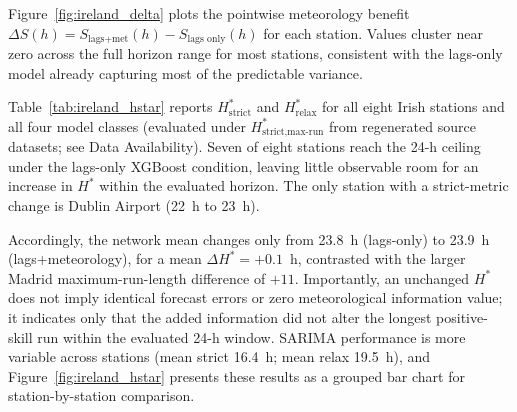 \documentclass[12pt,a4paper]{article}
\begin{document}
Figure~\ref{fig:ireland_delta} plots the pointwise meteorology benefit
$\Delta S(h) = S_{\text{lags+met}}(h) - S_{\text{lags only}}(h)$ for each
station.  Values cluster near zero across the full horizon range for most
stations, consistent with the lags-only model already capturing most of the
predictable variance.

Table~\ref{tab:ireland_hstar} reports $H^*_{\text{strict}}$ and
$H^*_{\text{relax}}$ for all eight Irish stations and all four model classes
(evaluated under $H^*_{\text{strict,max-run}}$ from regenerated source
datasets; see Data Availability).  Seven of eight stations reach the 24-h
ceiling under the lags-only XGBoost condition, leaving little observable room
for an increase in $H^*$ within the evaluated horizon.  The only station with a
strict-metric change is Dublin Airport (22~h to 23~h).

Accordingly, the network mean changes only from 23.8~h (lags-only) to 23.9~h
(lags+meteorology), for a mean $\Delta H^*=+0.1$~h, contrasted with the larger
Madrid maximum-run-length difference of $+11$.  Importantly, an unchanged $H^*$
does not imply identical forecast errors or zero meteorological information
value; it indicates only that the added information did not alter the longest
positive-skill run within the evaluated 24-h window.  SARIMA performance is
more variable across stations (mean strict 16.4~h; mean relax 19.5~h), and
Figure~\ref{fig:ireland_hstar} presents these results as a grouped bar chart
for station-by-station comparison.
\end{document}
